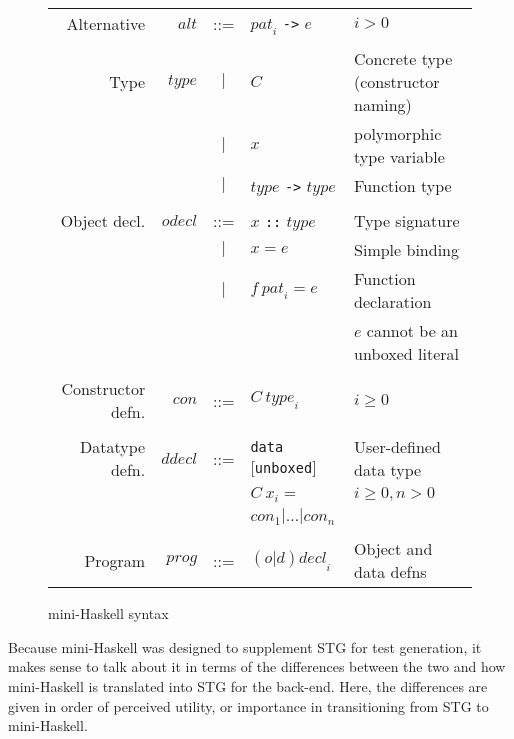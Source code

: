 \documentclass{llncs}
\begin{document}
\begin{figure}[h!tb]
\begin{tabular}{r r c l l}
\\
Alternative        & $\mathit{alt}$      & ::= & $\mathit{pat}_i$ \texttt{->} $e$ & $i > 0$ \\
\\
Type               & $\mathit{type}$     & $|$ & $C$ & Concrete type (constructor naming) \\
                   &                     & $|$ & $x$ & polymorphic type variable \\
                   &                     & $|$ & $\mathit{type}$ \texttt{->} $\mathit{type}$ & Function type \\
\\
Object decl. & $\mathit{odecl}$    & ::= & $x$ \texttt{::} $\mathit{type}$ & Type signature \\
                   &                     & $|$ & $x = e$ & Simple binding \\
                   &                     & $|$ & $f\ \mathit{pat}_i = e$ & Function declaration \\
                   &                     &     & & $e$ cannot be an unboxed literal \\
\\
Constructor defn. & $\mathit{con}$  & ::= & $C\ \mathit{type}_i$ & $i \ge 0$ \\
\\
Datatype defn. &  $\mathit{ddecl}$ & ::= & \texttt{data} [\texttt{unboxed}] & User-defined data type  \\
               &                   &     & $C\ x_i =$                       & $i \ge 0, n > 0$         \\
               &                   &     & $\mathit{con}_1 | \dots |  \mathit{con}_n$ \\

\\
Program                & $\mathit{prog}$ & ::= & $\mathit{(o|d)decl}_i$ & Object and data defns
\end{tabular}
\caption{mini-Haskell syntax}
\label{fig:miniHaskell}
\end{figure}


Because mini-Haskell was designed to supplement STG for test generation, it
makes sense to talk about it in terms of the differences between the two and
how mini-Haskell is translated into STG for the back-end.  Here, the
differences are given in order of perceived utility, or importance in
transitioning from STG to mini-Haskell.
\end{document}
